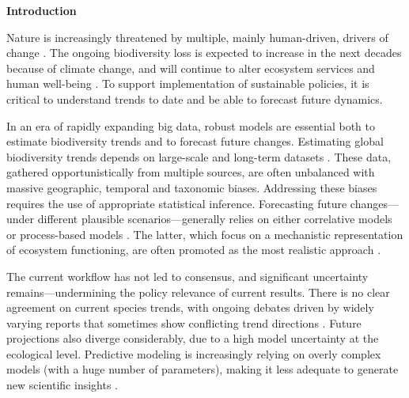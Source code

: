\documentclass[11pt]{article}
\begin{document}
\noindent \textbf{Introduction}

Nature is increasingly threatened by multiple, mainly human-driven, drivers of change \citep{Diaz2019}. The ongoing biodiversity loss is expected to increase in the next decades because of climate change, and will continue to alter ecosystem services and human well-being \citep{IPBES2019}. To support implementation of sustainable policies, it is critical to understand trends to date and be able to forecast future dynamics. 

In an era of rapidly expanding big data, robust models are essential both to estimate biodiversity trends and to forecast future changes.
Estimating global biodiversity trends depends on large-scale and long-term datasets \citep[e.g.][]{Dornelas2018}. These data, gathered opportunistically from multiple sources, are often unbalanced with massive geographic, temporal and taxonomic biases. Addressing these biases requires the use of appropriate statistical inference.
Forecasting future changes---under different plausible scenarios---generally relies on either correlative models or process-based models \citep{IPBES2019}. The latter, which focus on a mechanistic representation of ecosystem functioning, are often promoted as the most realistic approach \citep{Urban2016, Pilowsky2022}. 

The current workflow has not led to consensus, and significant uncertainty remains---undermining the policy relevance of current results. %
There is no clear agreement on current species trends, with ongoing debates driven by widely varying reports that sometimes show conflicting trend directions \citep{Dornelas2014, Leung2020, Buschke2021, Johnson2024}. Future projections also diverge considerably, due to a high model uncertainty at the ecological level. Predictive modeling is increasingly relying on overly complex models (with a huge number of parameters), making it less adequate to generate new scientific insights \citep{Franklin2020}.
\end{document}
